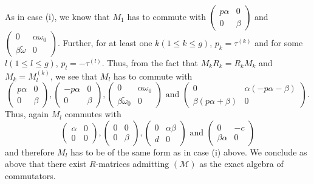 \begin{enumerate}
As in case (i), we know that $M_{1}$ has to commute with
$\left(\begin{smallmatrix} p\alpha & 0\\ 0 & \beta
\end{smallmatrix}\right)$ and $\left(\begin{smallmatrix} 0 &
  \alpha\omega_{0}\\ \beta\widetilde{\omega} & 0
\end{smallmatrix}\right)$. Further, for at least one $k(1\leq k\leq
g)$, $p_{k}=\tau^{(k)}$ and for some $l(1\leq l\leq g)$,
$p_{l}=-\tau^{(l)}$. Thus, from the fact that $M_{k}R_{k}=R_{k}M_{k}$
and $M_{k}=M_{l}^{(k)}$, we see that $M_{l}$ has to commute with 
{\fontsize{10}{12}\selectfont
$$
\begin{pmatrix}
p\alpha &  0\\
0 & \beta
\end{pmatrix},
\begin{pmatrix}
-p\alpha & 0\\
0 & \beta
\end{pmatrix},
\begin{pmatrix}
0 & \alpha\omega_{0}\\
\beta\widetilde{\omega}_{0} & 0
\end{pmatrix}\text{ \  and \ }
\begin{pmatrix}
0 & \alpha(-p\alpha-\beta)\\
\beta(p\alpha+\beta) & 0
\end{pmatrix}.
$$}\relax
Thus, again $M_{l}$ commutes with 
$$
\begin{pmatrix} 
\alpha &  0\\ 
0 & 0
\end{pmatrix},
\begin{pmatrix}
0 & 0\\
0 & \beta
\end{pmatrix},
\begin{pmatrix}
0 & \alpha\beta\\
d & 0
\end{pmatrix}
\text{ \  and \ }
\begin{pmatrix}
0 & -c\\
\beta\alpha & 0
\end{pmatrix}
$$
and therefore $M_{l}$ has to be of the same form as in case (i)
above. We conclude as above that there exist $R$-matrices admitting
$(\mathscr{M})$ as the exact algebra of commutators.


\end{enumerate}

